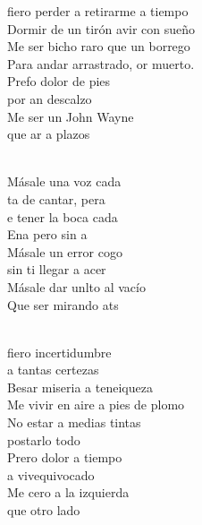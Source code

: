 \begin{cancion}%
	fiero perder a retirarme a tiempo\\
	Dormir de un tirón avir con sueño\\
	Me ser bicho raro que un borrego\\
	Para andar arrastrado, or muerto.\\
	Prefo dolor de pies\\
	por an descalzo\\
	Me ser un John Wayne \\
	que ar a plazos \\\jump\\
	\begin{chorus}%
	Másale una voz cada\\
	ta de cantar, pera\\
	e tener la boca cada\\
	Ena pero sin a\\
	Másale un error cogo\\
	 sin ti llegar a acer\\
	Másale dar unlto al vacío  \\
	Que ser mirando ats\\
	\end{chorus}%
	\jump\\
	fiero incertidumbre \\
a tantas certezas\\
	Besar miseria a teneiqueza\\
	Me vivir en aire a pies de plomo\\
No estar a medias tintas \\
	postarlo todo\\
	Prero dolor a tiempo \\
	a vivequivocado\\
	Me cero a la izquierda \\
	que otro lado\\\jump\\

\end{cancion}
